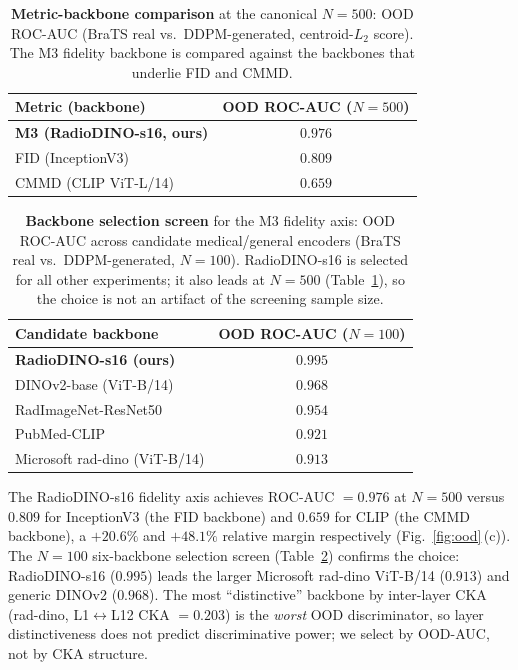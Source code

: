 \documentclass[lettersize,journal]{IEEEtran}
\begin{document}
\begin{table}[t]
\centering
\caption{%
  \textbf{Metric-backbone comparison} at the canonical $N = 500$: OOD ROC-AUC
  (BraTS real vs.\ DDPM-generated, centroid-$L_2$ score). The M3 fidelity
  backbone is compared against the backbones that underlie FID and CMMD.
}
\label{tab:ood_metric}
\begin{tabular}{lc}
\toprule
Metric (backbone) & OOD ROC-AUC ($N{=}500$) \\
\midrule
\textbf{M3 (RadioDINO-s16, ours)} & $\mathbf{0.976}$ \\
FID (InceptionV3)                 & $0.809$ \\
CMMD (CLIP ViT-L/14)              & $0.659$ \\
\bottomrule
\end{tabular}
\end{table}

\begin{table}[t]
\centering
\caption{%
  \textbf{Backbone selection screen} for the M3 fidelity axis: OOD ROC-AUC
  across candidate medical/general encoders (BraTS real vs.\ DDPM-generated,
  $N = 100$). RadioDINO-s16 is selected for all other experiments; it also
  leads at $N = 500$ (Table~\ref{tab:ood_metric}), so the choice is not an
  artifact of the screening sample size.
}
\label{tab:ood_sweep}
\begin{tabular}{lc}
\toprule
Candidate backbone & OOD ROC-AUC ($N{=}100$) \\
\midrule
\textbf{RadioDINO-s16 (ours)}   & $\mathbf{0.995}$ \\
DINOv2-base (ViT-B/14)          & $0.968$ \\
RadImageNet-ResNet50            & $0.954$ \\
PubMed-CLIP                     & $0.921$ \\
Microsoft rad-dino (ViT-B/14)   & $0.913$ \\
\bottomrule
\end{tabular}
\end{table}

The RadioDINO-s16 fidelity axis achieves ROC-AUC $= 0.976$ at $N = 500$
versus $0.809$ for InceptionV3 (the FID backbone) and $0.659$ for CLIP
(the CMMD backbone), a $+20.6\%$ and $+48.1\%$ relative margin
respectively (Fig.~\ref{fig:ood}\,(c)). The $N = 100$ six-backbone selection
screen (Table~\ref{tab:ood_sweep}) confirms the choice: RadioDINO-s16
($0.995$) leads the larger Microsoft rad-dino ViT-B/14 ($0.913$) and
generic DINOv2 ($0.968$). The most ``distinctive'' backbone by
inter-layer CKA (rad-dino, L1$\leftrightarrow$L12 CKA $= 0.203$) is the
\emph{worst} OOD discriminator, so layer distinctiveness does not predict
discriminative power; we select by OOD-AUC, not by CKA structure.
\end{document}
